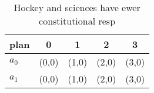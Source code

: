 \documentclass[a4paper]{article}
\begin{document}
\begin{table}
\begin{adjustbox}{width=0.7\columnwidth}
\begin{tabular}{|l|l|l|l|l|}
\hline
\textbf{plan} & \multicolumn{1}{c|}{\textbf{0}} & \multicolumn{1}{c|}{\textbf{1}} & \multicolumn{1}{c|}{\textbf{2}} & \multicolumn{1}{c|}{\textbf{3}} \\ \hline
\textbf{$a_0$}  & (0,0) & (1,0) & (2,0) & (3,0) \\ \hline
\textbf{$a_1$}  & (0,0) & (1,0) & (2,0) & (3,0) \\ \hline
\end{tabular}
\end{adjustbox}
\caption{Hockey and sciences have ewer constitutional resp
}
\end{table}
\end{document}
